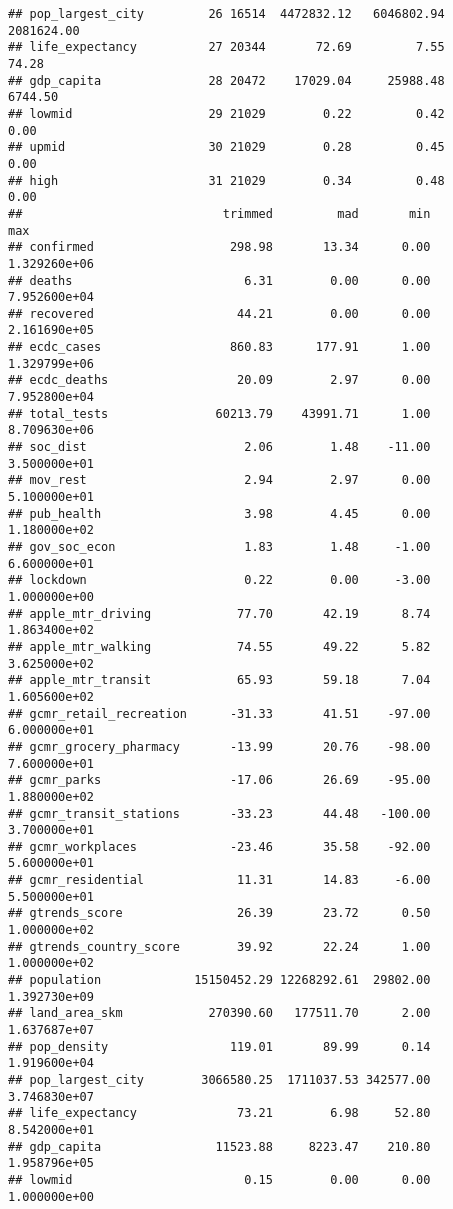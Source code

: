 \documentclass[]{article}
\begin{document}
\begin{verbatim}
## pop_largest_city         26 16514  4472832.12   6046802.94 2081624.00
## life_expectancy          27 20344       72.69         7.55      74.28
## gdp_capita               28 20472    17029.04     25988.48    6744.50
## lowmid                   29 21029        0.22         0.42       0.00
## upmid                    30 21029        0.28         0.45       0.00
## high                     31 21029        0.34         0.48       0.00
##                            trimmed         mad       min          max
## confirmed                   298.98       13.34      0.00 1.329260e+06
## deaths                        6.31        0.00      0.00 7.952600e+04
## recovered                    44.21        0.00      0.00 2.161690e+05
## ecdc_cases                  860.83      177.91      1.00 1.329799e+06
## ecdc_deaths                  20.09        2.97      0.00 7.952800e+04
## total_tests               60213.79    43991.71      1.00 8.709630e+06
## soc_dist                      2.06        1.48    -11.00 3.500000e+01
## mov_rest                      2.94        2.97      0.00 5.100000e+01
## pub_health                    3.98        4.45      0.00 1.180000e+02
## gov_soc_econ                  1.83        1.48     -1.00 6.600000e+01
## lockdown                      0.22        0.00     -3.00 1.000000e+00
## apple_mtr_driving            77.70       42.19      8.74 1.863400e+02
## apple_mtr_walking            74.55       49.22      5.82 3.625000e+02
## apple_mtr_transit            65.93       59.18      7.04 1.605600e+02
## gcmr_retail_recreation      -31.33       41.51    -97.00 6.000000e+01
## gcmr_grocery_pharmacy       -13.99       20.76    -98.00 7.600000e+01
## gcmr_parks                  -17.06       26.69    -95.00 1.880000e+02
## gcmr_transit_stations       -33.23       44.48   -100.00 3.700000e+01
## gcmr_workplaces             -23.46       35.58    -92.00 5.600000e+01
## gcmr_residential             11.31       14.83     -6.00 5.500000e+01
## gtrends_score                26.39       23.72      0.50 1.000000e+02
## gtrends_country_score        39.92       22.24      1.00 1.000000e+02
## population             15150452.29 12268292.61  29802.00 1.392730e+09
## land_area_skm            270390.60   177511.70      2.00 1.637687e+07
## pop_density                 119.01       89.99      0.14 1.919600e+04
## pop_largest_city        3066580.25  1711037.53 342577.00 3.746830e+07
## life_expectancy              73.21        6.98     52.80 8.542000e+01
## gdp_capita                11523.88     8223.47    210.80 1.958796e+05
## lowmid                        0.15        0.00      0.00 1.000000e+00

\end{verbatim}
\end{document}
